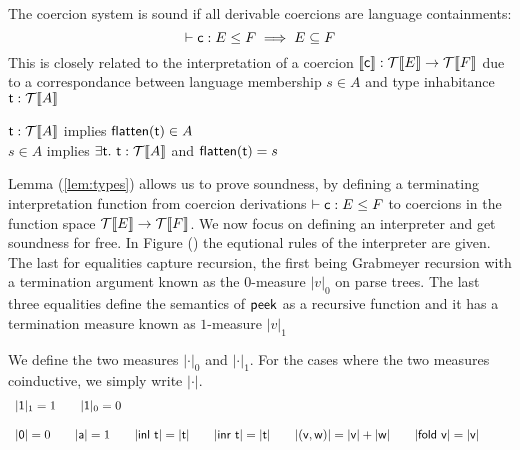 The coercion system is sound if all derivable coercions are language containments:
\[\vdash \mathsf{c} : E \leq F \implies E \subseteq F\]
This is closely related to the interpretation of a coercion $\llbracket \mathsf{c} \rrbracket : \mathcal{T}\llbracket E \rrbracket \rightarrow \mathcal{T}\llbracket F \rrbracket$ due to a correspondance between language membership $s \in A$ and type inhabitance $\mathsf{t} : \mathcal{T}\llbracket A \rrbracket$
\begin{lemma}\label{lem:types}
$\mathsf{t} : \mathcal{T}\llbracket A \rrbracket$ implies $\mathsf{flatten}(\mathsf{t}) \in A$\\
$s \in A$ implies $\exists \mathsf{t}.~\mathsf{t} : \mathcal{T}\llbracket A \rrbracket$ and $\mathsf{flatten}(\mathsf{t}) = s$
\end{lemma}
Lemma (\ref{lem:types}) allows us to prove soundness, by defining a terminating interpretation function from coercion derivations $\vdash \mathsf{c} : E \leq F$ to coercions in the function space $\mathcal{T}\llbracket E \rrbracket \rightarrow \mathcal{T}\llbracket F \rrbracket$.
We now focus on defining an interpreter and get soundness for free. In Figure (\label{fig:interp}) the equtional rules of the interpreter are given. The last for equalities capture recursion, the first being Grabmeyer recursion with a termination argument known as the $0$-measure $|v|_0$ on parse trees. The last three equalities define the semantics of $\mathsf{peek}$ as a recursive function and it has a termination measure known as $1$-measure $|v|_1$ 
\begin{definition}
We define the two measures $|\cdot|_0$ and $|\cdot|_1$. For the cases where the two measures coinductive, we simply write $|\cdot|$.
  \begin{displaymath}
    \begin{array}{lll}
|\mathsf{1}|_1 = 1 \qquad |\mathsf{1}|_0 = 0
\\\\
 |\mathsf{0}| = 0 \qquad |\mathsf{a}| = 1 \qquad |\mathsf{inl~ t}| = |\mathsf{t}| \qquad |\mathsf{inr~ t}| = |\mathsf{t}| \qquad  |\mathsf{(v,w)}|=|\mathsf{v}|+|\mathsf{w}| \qquad  |\mathsf{fold~v}|=|\mathsf{v}|\qquad


    \end{array}
  \end{displaymath}
\end{definition}
